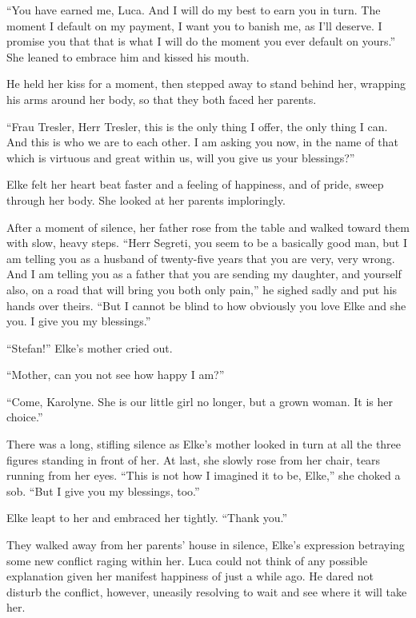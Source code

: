 ``You have earned me, Luca. And I will do my best to earn you in turn. The moment I default on my payment, I want you to banish me, as I'll deserve. I promise you that that is what I will do the moment you ever default on yours.'' She leaned to embrace him and kissed his mouth.

He held her kiss for a moment, then stepped away to stand behind her, wrapping his arms around her body, so that they both faced her parents.

``Frau Tresler, Herr Tresler, this is the only thing I offer, the only thing I can. And this is who we are to each other. I am asking you now, in the name of that which is virtuous and great within us, will you give us your blessings?''

Elke felt her heart beat faster and a feeling of happiness, and of pride, sweep through her body. She looked at her parents imploringly.

After a moment of silence, her father rose from the table and walked toward them with slow, heavy steps. ``Herr Segreti, you seem to be a basically good man, but I am telling you as a husband of twenty-five years that you are very, very wrong. And I am telling you as a father that you are sending my daughter, and yourself also, on a road that will bring you both only pain,'' he sighed sadly and put his hands over theirs. ``But I cannot be blind to how obviously you love Elke and she you. I give you my blessings.''

``Stefan!'' Elke's mother cried out.

``Mother, can you not see how happy I am?''

``Come, Karolyne. She is our little girl no longer, but a grown woman. It is her choice.''

There was a long, stifling silence as Elke's mother looked in turn at all the three figures standing in front of her. At last, she slowly rose from her chair, tears running from her eyes. ``This is not how I imagined it to be, Elke,'' she choked a sob. ``But I give you my blessings, too.''

Elke leapt to her and embraced her tightly. ``Thank you.''

\sectionline

They walked away from her parents' house in silence, Elke's expression betraying some new conflict raging within her. Luca could not think of any possible explanation given her manifest happiness of just a while ago. He dared not disturb the conflict, however, uneasily resolving to wait and see where it will take her.

